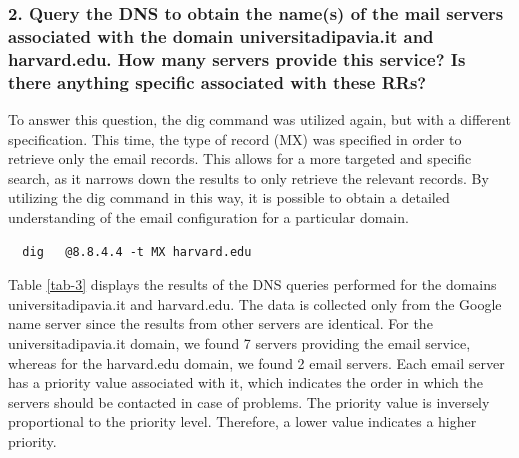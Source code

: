 \documentclass[eng]{class}
\begin{document}
\subsubsection*{2. Query the DNS to obtain the name(s) of the mail servers associated with the
  domain universitadipavia.it and harvard.edu. How many servers
  provide this service? Is there anything specific associated with these RRs?}

To answer this question, the dig command was utilized again, but with a different specification.
This time, the type of record (MX) was specified in order to retrieve only the email records.
This allows for a more targeted and specific search, as it narrows down the results to only retrieve the relevant records.
By utilizing the dig command in this way, it is possible to obtain a detailed understanding of the email configuration for a particular domain.
\begin{lstlisting}
  dig   @8.8.4.4 -t MX harvard.edu
\end{lstlisting}
Table \ref*{tab-3} displays the results of the DNS queries performed for the domains universitadipavia.it and harvard.edu.
The data is collected only from the Google name server since the results from other servers are identical.\newline
For the universitadipavia.it domain, we found 7 servers providing the email service, whereas for the harvard.edu domain, we found 2 email servers.
Each email server has a priority value associated with it, which indicates the order in which the servers should be contacted in case of problems.
The priority value is inversely proportional to the priority level. Therefore, a lower value indicates a higher priority.
\end{document}
